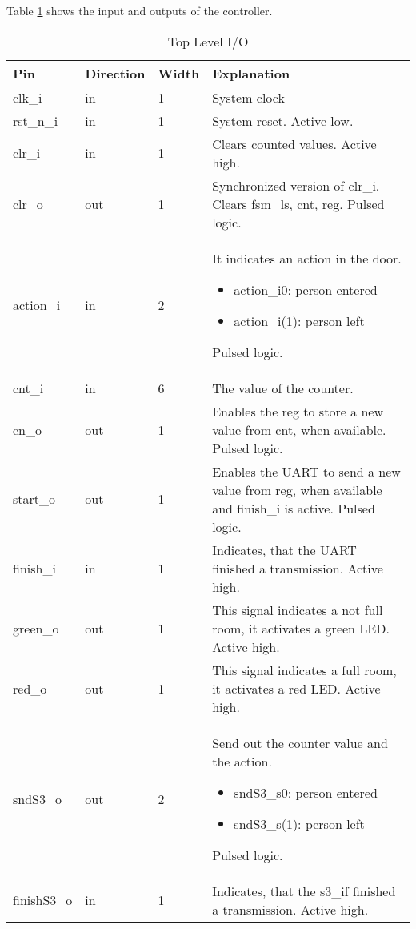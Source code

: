
Table \ref{tab:asCont01} shows the input and outputs of the controller.
\begin{table}[H]
\centering
\begin{tabularx}{\textwidth}{|l |l |l |X|}
  \hline
  Pin & Direction & Width & Explanation \\
  \hline
  \hline
  clk\_i & in & 1 & System clock \\
  \hline
  rst\_n\_i & in & 1 & System reset. Active low. \\
  \hline
  clr\_i & in & 1 & Clears counted values. Active high. \\
  \hline
  clr\_o & out & 1 & Synchronized version of clr\_i. Clears fsm\_ls, cnt, reg. Pulsed logic. \\
  \hline
  action\_i & in & 2 &  It indicates an action in the door. \begin{itemize} \item action\_i{0}: person entered \item action\_i(1): person left \end{itemize} Pulsed logic. \\
  \hline
  cnt\_i & in & 6 & The value of the counter. \\
  \hline
  en\_o & out & 1 & Enables the reg to store a new value from cnt, when available. Pulsed logic. \\
  \hline
  start\_o & out & 1 & Enables the UART to send a new value from reg, when available and finish\_i is active. Pulsed logic. \\
  \hline
  finish\_i & in & 1 & Indicates, that the UART finished a transmission. Active high. \\
  \hline
  green\_o & out & 1 & This signal indicates a not full room, it activates a green LED. Active high.  \\
  \hline
  red\_o & out & 1 & This signal indicates a full room, it activates a red LED. Active high.  \\
  \hline
  sndS3\_o & out & 2 & Send out the counter value and the action. \begin{itemize} \item sndS3\_s{0}: person entered \item sndS3\_s(1): person left \end{itemize} Pulsed logic.  \\
  \hline
  finishS3\_o & in & 1 & Indicates, that the s3\_if finished a transmission. Active high. \\
  \hline
\end{tabularx}
\caption{Top Level I/O}
\label{tab:asCont01}
\end{table}
